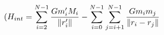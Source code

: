 \documentclass[preview]{standalone}
\begin{document}
\begin{align*}
\special{dvisvgm:raw <g id='unique000'>}(H_{int} = \sum_{i=2}^{N-1} \frac{Gm'_i M_i}{\norm{r'_i}} - \sum_{i=0}^{N-1} \sum_{j=i+1}^{N-1} \frac{Gm_im_j}{\norm{r_i - r_j}}\special{dvisvgm:raw </g>}
\end{align*}
\end{document}
